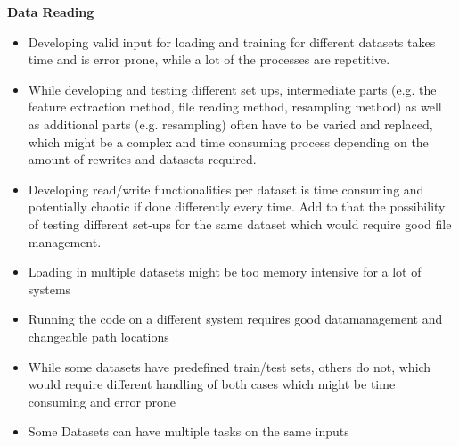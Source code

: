 \textbf{Data Reading}
\begin{itemize}
	\item Developing valid input for loading and training for different datasets takes time and is error prone, while a lot of the processes are repetitive.
	\item While developing and testing different set ups, intermediate parts (e.g. the feature extraction method, file reading method, resampling method) as well as additional parts (e.g. resampling) often have to be varied and replaced, which might be a complex and time consuming process depending on the amount of rewrites and datasets required.
	\item Developing read/write functionalities per dataset is time consuming and potentially chaotic if done differently every time. Add to that the possibility of testing different set-ups for the same dataset which would require good file management. 
	\item Loading in multiple datasets might be too memory intensive for a lot of systems 
	\item Running the code on a different system requires good datamanagement and changeable path locations
	\item While some datasets have predefined train/test sets, others do not, which would require different handling of both cases which might be time consuming and error prone
	\item Some Datasets can have multiple tasks on the same inputs 
\end{itemize}

